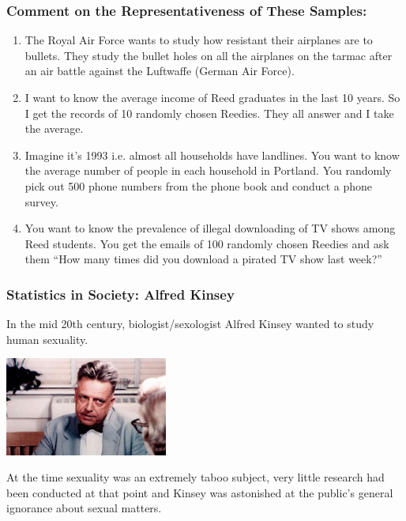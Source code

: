 \documentclass[handout]{beamer}
\begin{document}
\begin{frame}
\frametitle{Comment on the Representativeness of These Samples:}

\begin{small}
\begin{enumerate}
\item The Royal Air Force wants to study how resistant their airplanes are to bullets. They study the bullet holes on all the airplanes on the tarmac after an air battle against the Luftwaffe (German Air Force).
\item I want to know the average income of Reed graduates in the last 10 years.  So I get the records of 10 randomly chosen Reedies.  They all answer and I take the average.
\item Imagine it's 1993 i.e. almost all households have landlines.  You want to know the average number of people in each household in Portland.  You randomly pick out 500 phone numbers from the phone book and conduct a phone survey.
\item You want to know the prevalence of illegal downloading of TV shows among Reed students.  You get the emails of 100 randomly chosen Reedies and ask them ``How many times did you download a pirated TV show last week?''
\end{enumerate}
\end{small}

\end{frame}




\begin{frame}
\frametitle{Statistics in Society: Alfred Kinsey}
In the mid 20th century, biologist/sexologist Alfred Kinsey wanted to study human sexuality.  

\begin{center}
\pause \includegraphics[width=0.4\textwidth]{./figure/alfred-kinsey.jpg}
\end{center}

\pause At the time sexuality was an extremely taboo subject, very little research had been conducted at that point and Kinsey was astonished at the public's general ignorance about sexual matters.  



\end{frame}
\end{document}
